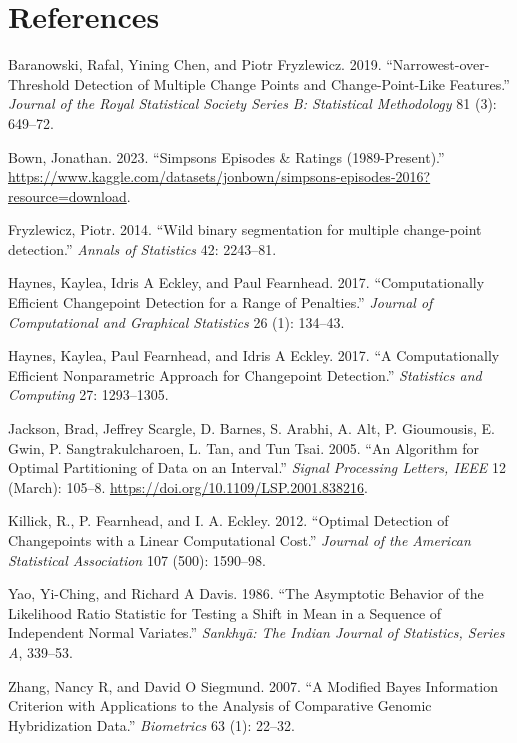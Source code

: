 \documentclass[
  letterpaper,
  DIV=11,
  numbers=noendperiod]{scrreprt}
\newlength{\cslhangindent}
\newenvironment{CSLReferences}[2] %
 {\begin{list}{}{%
  \setlength{\itemindent}{0pt}
  \setlength{\leftmargin}{0pt}
  \setlength{\parsep}{0pt}
  \ifodd #1
   \setlength{\leftmargin}{\cslhangindent}
   \setlength{\itemindent}{-1\cslhangindent}
  \fi
  \setlength{\itemsep}{#2\baselineskip}}}
 {\end{list}}
\begin{document}

\chapter*{References}\label{references}


\label{refs}
\begin{CSLReferences}{1}{0}
Baranowski, Rafal, Yining Chen, and Piotr Fryzlewicz. 2019.
{``Narrowest-over-Threshold Detection of Multiple Change Points and
Change-Point-Like Features.''} \emph{Journal of the Royal Statistical
Society Series B: Statistical Methodology} 81 (3): 649--72.

Bown, Jonathan. 2023. {``Simpsons Episodes \& Ratings (1989-Present).''}
\url{https://www.kaggle.com/datasets/jonbown/simpsons-episodes-2016?resource=download}.

Fryzlewicz, Piotr. 2014. {``{Wild binary segmentation for multiple
change-point detection}.''} \emph{Annals of Statistics} 42: 2243--81.

Haynes, Kaylea, Idris A Eckley, and Paul Fearnhead. 2017.
{``Computationally Efficient Changepoint Detection for a Range of
Penalties.''} \emph{Journal of Computational and Graphical Statistics}
26 (1): 134--43.

Haynes, Kaylea, Paul Fearnhead, and Idris A Eckley. 2017. {``A
Computationally Efficient Nonparametric Approach for Changepoint
Detection.''} \emph{Statistics and Computing} 27: 1293--1305.

Jackson, Brad, Jeffrey Scargle, D. Barnes, S. Arabhi, A. Alt, P.
Gioumousis, E. Gwin, P. Sangtrakulcharoen, L. Tan, and Tun Tsai. 2005.
{``An Algorithm for Optimal Partitioning of Data on an Interval.''}
\emph{Signal Processing Letters, IEEE} 12 (March): 105--8.
\url{https://doi.org/10.1109/LSP.2001.838216}.

Killick, R., P. Fearnhead, and I. A. Eckley. 2012. {``Optimal Detection
of Changepoints with a Linear Computational Cost.''} \emph{Journal of
the American Statistical Association} 107 (500): 1590--98.

Yao, Yi-Ching, and Richard A Davis. 1986. {``The Asymptotic Behavior of
the Likelihood Ratio Statistic for Testing a Shift in Mean in a Sequence
of Independent Normal Variates.''} \emph{Sankhy{ā}: The Indian Journal
of Statistics, Series A}, 339--53.

Zhang, Nancy R, and David O Siegmund. 2007. {``A Modified Bayes
Information Criterion with Applications to the Analysis of Comparative
Genomic Hybridization Data.''} \emph{Biometrics} 63 (1): 22--32.

\end{CSLReferences}
\end{document}
